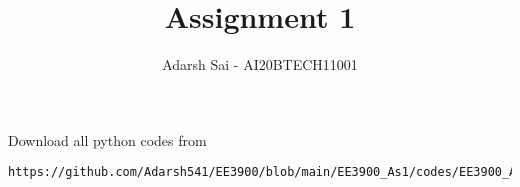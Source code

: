 \documentclass[journal,12pt,twocolumn]{IEEEtran}
\DeclareMathOperator*{\Res}{Res}
\begin{document}
\newcommand{\BEQA}{\begin{eqnarray}}
\newcommand{\EEQA}{\end{eqnarray}}
\newcommand{\define}{\stackrel{\triangle}{=}}

\raggedbottom
\setlength{\parindent}{0pt}
\providecommand{\mbf}{\mathbf}
\providecommand{\pr}[1]{\ensuremath{\Pr\left(#1\right)}}
\providecommand{\qfunc}[1]{\ensuremath{Q\left(#1\right)}}
\providecommand{\sbrak}[1]{\ensuremath{{}\left[#1\right]}}
\providecommand{\lsbrak}[1]{\ensuremath{{}\left[#1\right.}}
\providecommand{\rsbrak}[1]{\ensuremath{{}\left.#1\right]}}
\providecommand{\brak}[1]{\ensuremath{\left(#1\right)}}
\providecommand{\lbrak}[1]{\ensuremath{\left(#1\right.}}
\providecommand{\rbrak}[1]{\ensuremath{\left.#1\right)}}
\providecommand{\cbrak}[1]{\ensuremath{\left\{#1\right\}}}
\providecommand{\lcbrak}[1]{\ensuremath{\left\{#1\right.}}
\providecommand{\rcbrak}[1]{\ensuremath{\left.#1\right\}}}
\theoremstyle{remark}
\newtheorem{rem}{Remark}
\newcommand{\sgn}{\mathop{\mathrm{sgn}}}
\providecommand{\abs}[1]{\vert#1\vert}
\providecommand{\res}[1]{\Res\displaylimits_{#1}} 
\providecommand{\norm}[1]{\lVert#1\rVert}
\providecommand{\mtx}[1]{\mathbf{#1}}
\providecommand{\mean}[1]{E[ #1 ]}
\providecommand{\fourier}{\overset{\mathcal{F}}{ \rightleftharpoons}}
\providecommand{\system}{\overset{\mathcal{H}}{ \longleftrightarrow}}
\newcommand{\solution}{\noindent \textbf{Solution: }}
\newcommand{\cosec}{\,\text{cosec}\,}
\providecommand{\dec}[2]{\ensuremath{\overset{#1}{\underset{#2}{\gtrless}}}}
\newcommand{\myvec}[1]{\ensuremath{\begin{pmatrix}#1\end{pmatrix}}}
\newcommand{\mydet}[1]{\ensuremath{\begin{vmatrix}#1\end{vmatrix}}}
\makeatletter
{}
\makeatother
\let\StandardTheFigure\thefigure
\let\vec\mathbf
\renewcommand{\thefigure}{\theproblem}
\def\putbox#1#2#3{\makebox[0in][l]{\makebox[#1][l]{}\raisebox{\baselineskip}[0in][0in]{\raisebox{#2}[0in][0in]{#3}}}}
     \def\rightbox#1{\makebox[0in][r]{#1}}
     \def\centbox#1{\makebox[0in]{#1}}
     \def\topbox#1{\raisebox{-\baselineskip}[0in][0in]{#1}}
     \def\midbox#1{\raisebox{-0.5\baselineskip}[0in][0in]{#1}}
\vspace{3cm}
\title{Assignment 1}
\author{Adarsh Sai - AI20BTECH11001}
\maketitle
\newpage
\bigskip
\renewcommand{\thefigure}{\theenumi}
\renewcommand{\thetable}{\theenumi}
Download all python codes from 
\begin{lstlisting}
https://github.com/Adarsh541/EE3900/blob/main/EE3900_As1/codes/EE3900_As1.py
\end{lstlisting}
\end{document}
